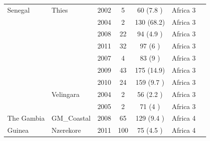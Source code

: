 \documentclass[9pt,lineno]{elife}
\begin{document}
\begin{table}[bt]
\begin{tabular}{l l c c c c c}
 \hline
Senegal         &Thies          &2002 &5    &60   (7.8 )&Africa 3\\
                &               &2004 &2    &130  (68.2)&Africa 3\\
                &               &2008 &22   &94   (4.9 )&Africa 3\\
                &               &2011 &32   &97   (6   )&Africa 3\\
                &               &2007 &4    &83   (9   )&Africa 3\\
                &               &2009 &43   &175  (14.9)&Africa 3\\
                &               &2010 &24   &159  (9.7 )&Africa 3\\
                &Velingara      &2004 &2    &56   (2.2 )&Africa 3\\
                &               &2005 &2    &71   (4   )&Africa 3\\
 \hline
The Gambia      &GM\_Coastal    &2008 &65   &129  (9.4 )&Africa 4\\
 \hline
Guinea          &Nzerekore      &2011 &100  &75   (4.5 )&Africa 4\\
\bottomrule
\end{tabular}


\end{table}
\end{document}
